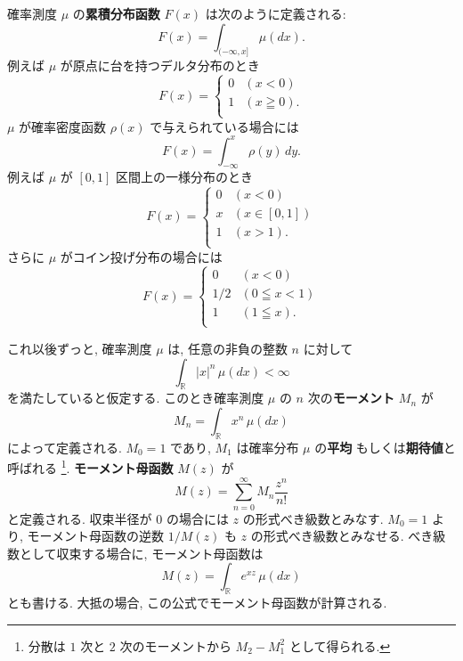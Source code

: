 \documentclass[12pt,twoside]{jarticle}
\newcommand\BF{\bfseries}
\newcommand\R{{\mathbb R}} %
\theoremstyle{jplain}
\theoremstyle{jplain}
\theoremstyle{jplain}
\numberwithin{theorem}{section}
\numberwithin{equation}{section}
\numberwithin{figure}{section}
\numberwithin{table}{section}
\begin{document}
確率測度 $\mu$ の{\BF 累積分布函数} $F(x)$ は次のように定義される:
\begin{equation*}
  F(x)= \int_{(-\infty,x]} \mu(dx).
\end{equation*}
例えば $\mu$ が原点に台を持つデルタ分布のとき
\begin{equation*}
  F(x)=\begin{cases}
    0 & (x<0) \\
    1 & (x\geqq 0). \\
  \end{cases}
\end{equation*}
$\mu$ が確率密度函数 $\rho(x)$ で与えられている場合には
\begin{equation*}
  F(x) = \int_{-\infty}^x \rho(y)\,dy.
\end{equation*}
例えば $\mu$ が $[0,1]$ 区間上の一様分布のとき
\begin{equation*}
  F(x) = \begin{cases}
    0 & (x<0) \\
    x & (x\in[0,1]) \\
    1 & (x>1). \\
\end{cases}
\end{equation*}
さらに $\mu$ がコイン投げ分布の場合には
\begin{equation*}
  F(x) = \begin{cases}
    0 & (x<0) \\
    1/2 & (0\leqq x < 1) \\
    1 & (1\leqq x). \\
  \end{cases}
\end{equation*}

これ以後ずっと, 確率測度 $\mu$ は, 任意の非負の整数 $n$ に対して
\begin{equation*}
  \int_\R |x|^n\,\mu(dx) < \infty
\end{equation*}
を満たしていると仮定する.
このとき確率測度 $\mu$ の $n$ 次の{\BF モーメント} $M_n$ が
\begin{equation*}
  M_n = \int_\R x^n\,\mu(dx)
\end{equation*}
によって定義される. $M_0=1$ であり,
$M_1$ は確率分布 $\mu$ の{\BF 平均}
もしくは{\BF 期待値}と呼ばれる%
\footnote{分散は $1$ 次と $2$ 次のモーメントから $M_2-M_1^2$ として得られる.}.
{\BF モーメント母函数} $M(z)$ が
\begin{equation*}
  M(z) = \sum_{n=0}^\infty M_n \frac{z^n}{n!}
\end{equation*}
と定義される.
収束半径が $0$ の場合には $z$ の形式べき級数とみなす.
$M_0=1$ より, モーメント母函数の逆数 $1/M(z)$ も $z$ の形式べき級数とみなせる.
べき級数として収束する場合に, モーメント母函数は
\begin{equation*}
  M(z) = \int_\R e^{xz}\,\mu(dx)
\end{equation*}
とも書ける.
大抵の場合, この公式でモーメント母函数が計算される.
\end{document}
